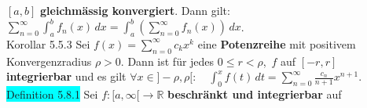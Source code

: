 \documentclass[landscape, 10pt]{article}
\newcommand{\R}{\mathbb{R}}
\begin{document}
\begin{multicols}{3}
                     \textcolor{NavyBlue}{$[a,b]$}
                     \textbf{gleichmässig konvergiert}. Dann gilt: 
                     \textcolor{NavyBlue}{$\sum_{n=0}^\infty\int_a^bf_n(x)\,dx
                     =\int_a^b(\sum_{n=0}^\infty f_n(x))\,dx$}. \\
              \colorbox{BurntOrange}{Korollar 5.5.3} 
                     Sei \textcolor{NavyBlue}{$f(x)=\sum_{n=0}^\infty c_kx^k$} 
                     eine \textbf{Potenzreihe} mit positivem Konvergenzradius 
                     \textcolor{NavyBlue}{$\rho>0$}. Dann ist für jedes 
                     \textcolor{NavyBlue}{$0\leqslant r<\rho$},\,
                     \textcolor{NavyBlue}{$f$} 
                     auf \textcolor{NavyBlue}{$[-r,r]$}
                     \textbf{integrierbar} und es gilt 
                     \textcolor{NavyBlue}{$\forall x\in]-\rho,\rho[:\quad
                     \int_0^xf(t)\,dt=\sum_{n=0}^\infty\frac{c_n}{n+1}x^{n+1}$}.\\
              \colorbox{cyan}{Definition 5.8.1} 
                     Sei \textcolor{NavyBlue}{$f:[a,\infty[\longrightarrow\R$}
                     \textbf{beschränkt und integrierbar} auf 

\end{multicols}
\end{document}
